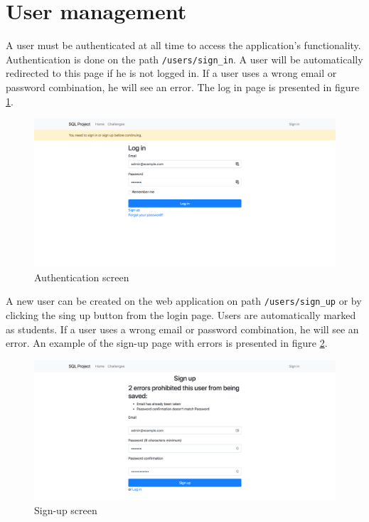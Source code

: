 \section{User management}
A user must be authenticated at all time to access the application's functionality. Authentication is done on the path \texttt{/users/sign\_in}. A user will be automatically redirected to this page if he is not logged in. If a user uses a wrong email or password combination, he will see an error. The log in page is presented in figure \ref{fig:app:authentication}.

\begin{figure}[ht]
    \centering
    \includegraphics[width=\textwidth/4*3]{Appendices/authentication.png}
    \caption{Authentication screen}
    \label{fig:app:authentication}
\end{figure}

A new user can be created on the web application on path \texttt{/users/sign\_up} or by clicking the sing up button from the login page. Users are automatically marked as students. If a user uses a wrong email or password combination, he will see an error. An example of the sign-up page with errors is presented in figure \ref{fig:app:newuser}.

\begin{figure}[ht]
    \centering
    \includegraphics[width=\textwidth/4*3]{Appendices/signup.png}
    \caption{Sign-up screen}
    \label{fig:app:newuser}
\end{figure}

